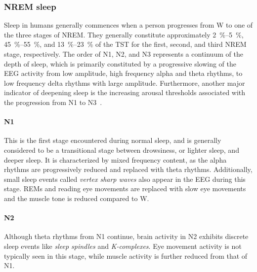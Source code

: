             \subsubsection{NREM sleep}
            Sleep in humans generally commences when a person progresses from \ac{W} to one of the three stages of \ac{NREM}.
            They generally constitute approximately \SIrange{2}{5}{\percent}, \SIrange{45}{55}{\percent}, and \SIrange{13}{23}{\percent} of the \ac{TST} for the first, second, and third \ac{NREM} stage, respectively.
            The order of \ac{N1}, \ac{N2}, and \ac{N3} represents a continuum of the depth of sleep, which is primarily constituted by a progressive slowing of the \ac{EEG} activity from low amplitude, high frequency alpha and theta rhythms, to low frequency delta rhythms with large amplitude.
            Furthermore, another major indicator of deepening sleep is the increasing arousal thresholds associated with the progression from \ac{N1} to \ac{N3}~\cite{Brown2012, Carskadon2011}.
            
            \paragraph{N1} This is the first stage encountered during normal sleep, and is generally considered to be a transitional stage between drowsiness, or lighter sleep, and deeper sleep.
            It is characterized by mixed frequency content, as the alpha rhythms are progressively reduced and replaced with theta rhythms.
            Additionally, small sleep events called \textit{vertex sharp waves} also appear in the \ac{EEG} during this stage.
            \Acp{REM} and reading eye movements are replaced with slow eye movements and the muscle tone is reduced compared to \ac{W}.
            
            \paragraph{N2} Although theta rhythms from \ac{N1} continue, brain activity in \ac{N2} exhibits discrete sleep events like \textit{sleep spindles} and \textit{K-complexes}.
            Eye movement activity is not typically seen in this stage, while muscle activity is further reduced from that of \ac{N1}.
            

